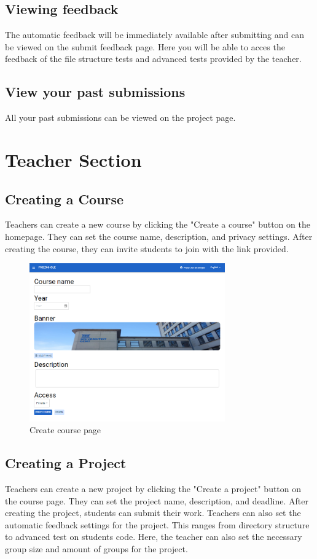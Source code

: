 \documentclass{article}
\begin{document}
\subsection{Viewing feedback}
The automatic feedback will be immediately available after submitting and can be viewed on the submit feedback page. Here you will be able to acces the feedback of the file structure tests and advanced tests provided by the teacher.

\subsection{View your past submissions}
All your past submissions can be viewed on the project page.

\section{Teacher Section}

\subsection{Creating a Course}
Teachers can create a new course by clicking the "Create a course" button on the homepage. They can set the course name, description, and privacy settings. After creating the course, they can invite students to join with the link provided.

\begin{figure}[H]
    \centering
    \includegraphics[width=0.75\textwidth]{images/createcourse.png}
    \caption{Create course page}
\end{figure}

\subsection{Creating a Project}
Teachers can create a new project by clicking the "Create a project" button on the course page. They can set the project name, description, and deadline. After creating the project, students can submit their work.
Teachers can also set the automatic feedback settings for the project. This ranges from directory structure to advanced test on students code. 
Here, the teacher can also set the necessary group size and amount of groups for the project.
\end{document}
